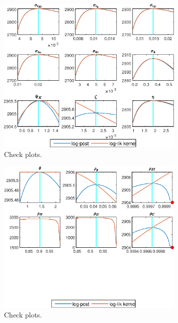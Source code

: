  
\begin{figure}[H]
\centering 
\includegraphics[width=0.80\textwidth]{BRS_imp_mobility_alt/graphs/BRS_imp_mobility_alt_CheckPlots1}
\caption{Check plots.}\label{Fig:CheckPlots:1}
\end{figure}
 
\begin{figure}[H]
\centering 
\includegraphics[width=0.80\textwidth]{BRS_imp_mobility_alt/graphs/BRS_imp_mobility_alt_CheckPlots2}
\caption{Check plots.}\label{Fig:CheckPlots:2}
\end{figure}
 
